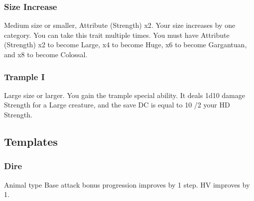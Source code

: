 \subsubsection{Size Increase}
\featpre Medium size or smaller, Attribute (Strength) x2.
\featben Your size increases by one category.
 You can take this trait multiple times. You must have Attribute (Strength) x2 to become Large, x4 to become Huge, x6 to become Gargantuan, and x8 to become Colossal.

\subsubsection{Trample I}
\featpre Large size or larger.
\featben You gain the trample special ability. It deals 1d10 damage \add Strength for a Large creature, and the save DC is equal to 10 /2 your HD \add Strength.

\subsection{Templates}
\subsubsection{Dire}
\featpre Animal type
\featben Base attack bonus progression improves by 1 step. HV improves by 1.
